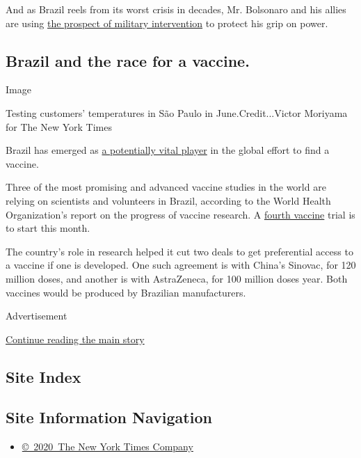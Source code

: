 And as Brazil reels from its worst crisis in decades, Mr. Bolsonaro and
his allies are using
\href{https://www.nytimes3xbfgragh.onion/2020/06/10/world/americas/bolsonaro-coup-coronavirus-brazil.html?smid=nytcore-ios-share}{the
prospect of military intervention} to protect his grip on power.

\hypertarget{brazil-and-the-race-for-a-vaccine}{%
\subsection{Brazil and the race for a
vaccine.}\label{brazil-and-the-race-for-a-vaccine}}

Image

Testing customers' temperatures in São Paulo in June.Credit...Victor
Moriyama for The New York Times

Brazil has emerged as
\href{https://www.nytimes3xbfgragh.onion/2020/08/15/world/americas/brazil-coronavirus-vaccine.html?smid=tw-share}{a
potentially vital player} in the global effort to find a vaccine.

Three of the most promising and advanced vaccine studies in the world
are relying on scientists and volunteers in Brazil, according to the
World Health Organization's report on the progress of vaccine research.
A \href{http://portal.anvisa.gov.br/estudos-clinicos-covid-19}{fourth
vaccine} trial is to start this month.

The country's role in research helped it cut two deals to get
preferential access to a vaccine if one is developed. One such agreement
is with China's Sinovac, for 120 million doses, and another is with
AstraZeneca, for 100 million doses year. Both vaccines would be produced
by Brazilian manufacturers.

Advertisement

\protect\hyperlink{after-bottom}{Continue reading the main story}

\hypertarget{site-index}{%
\subsection{Site Index}\label{site-index}}

\hypertarget{site-information-navigation}{%
\subsection{Site Information
Navigation}\label{site-information-navigation}}

\begin{itemize}
\tightlist
\item
  \href{https://help.nytimes3xbfgragh.onion/hc/en-us/articles/115014792127-Copyright-notice}{©~2020~The
  New York Times Company}
\end{itemize}

